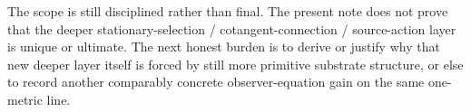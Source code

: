 \documentclass[11pt]{article}
\begin{document}
The scope is still disciplined rather than final. The present note does not prove that the deeper stationary-selection / cotangent-connection / source-action layer is unique or ultimate. The next honest burden is to derive or justify why that new deeper layer itself is forced by still more primitive substrate structure, or else to record another comparably concrete observer-equation gain on the same one-metric line.
\end{document}
